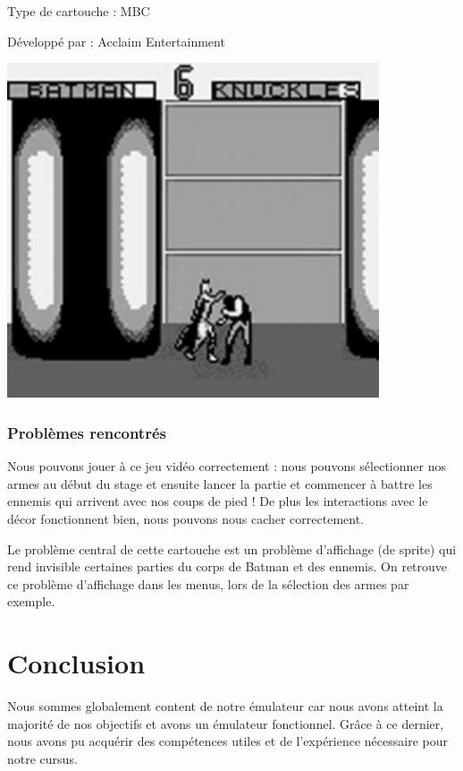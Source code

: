 \documentclass[12pt, a4paper]{article}
\begin{document}
Type de cartouche : MBC

Développé par : Acclaim Entertainment

\bigskip
\begin{center}
\includegraphics[width=11cm]{batman.jpg}
\end{center}
\bigskip
\subsubsection{Problèmes rencontrés}

Nous pouvons jouer à ce jeu vidéo correctement : nous pouvons sélectionner nos armes au début du stage et ensuite lancer la partie et commencer à battre les ennemis qui arrivent avec nos coups de pied ! De plus les interactions avec le décor fonctionnent bien, nous pouvons nous cacher correctement.

\bigskip
Le problème central de cette cartouche est un problème d'affichage (de sprite) qui rend invisible certaines parties du corps de Batman et des ennemis. On retrouve ce problème d'affichage dans les menus, lors de la sélection des armes par exemple.

\pagebreak

\section{Conclusion}

Nous sommes globalement content de notre émulateur car nous avons atteint la majorité de nos objectifs et avons un émulateur fonctionnel. Grâce à ce dernier, nous avons pu acquérir des compétences utiles et de l'expérience nécessaire pour notre cursus. 
\bigskip
\end{document}
